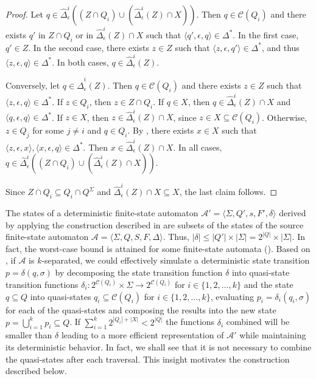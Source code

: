 \begin{proof}
  Let $q \in \hat{\Delta}_\epsilon^i((Z \cap Q_i) \cup (\hat{\Delta}_\epsilon^i(Z)
  \cap X))$. Then $q \in \mathcal{C}(Q_i)$ and there exists $q'$ in $Z \cap Q_i$ or in
  $\hat{\Delta}_\epsilon^i(Z) \cap X$ such that $\langle q', \epsilon, q \rangle \in
  \Delta^*$. In the first case, $q' \in Z$. In the second case, there exists $z \in Z$
  such that $\langle z, \epsilon, q' \rangle \in \Delta^*$, and thus $\langle z,
  \epsilon, q \rangle \in \Delta^*$. In both cases, $q \in \hat{\Delta}_\epsilon^i(Z)$.

  Conversely, let $q \in \hat{\Delta}_\epsilon^i(Z)$. Then $q \in \mathcal{C}(Q_i)$ and
  there exists $z \in Z$ such that $\langle z, \epsilon, q \rangle \in \Delta^*$. If $z
  \in Q_i$, then $z \in Z \cap Q_i$. If $q \in X$, then $q \in
  \hat{\Delta}_\epsilon^i(Z) \cap X$ and $\langle q, \epsilon, q \rangle \in \Delta^*$.
  If $z \in X$, then $z \in \hat{\Delta}_\epsilon^i(Z) \cap X$, since $z \in X
  \subseteq \mathcal{C}(Q_i)$. Otherwise, $z \in Q_j$ for some $j \neq i$ and $q \in
  Q_i$. By , there exists $x \in X$ such that $\langle z,
  \epsilon, x \rangle, \langle x, \epsilon, q \rangle \in \Delta^*$. Then $x \in
  \hat{\Delta}_\epsilon^i(Z) \cap X$. In all cases, $q \in \hat{\Delta}_\epsilon^i((Z
  \cap Q_i) \cup (\hat{\Delta}_\epsilon^i(Z) \cap X))$.

  Since $Z \cap Q_i \subseteq Q_i \cap Q^\Sigma$ and $\hat{\Delta}_\epsilon^i(Z) \cap X
  \subseteq X$, the last claim follows.
\end{proof}

The states of a deterministic finite-state automaton $\mathcal{A'} = \langle \Sigma,
Q', s, F', \delta \rangle$ derived by applying the construction described in
 are subsets of the states of the source finite-state automaton
$\mathcal{A} = \langle \Sigma, Q, S, F, \Delta \rangle$. Thus, $|\delta| \leq |Q'|
\times |\Sigma| = 2^{|Q|} \times |\Sigma|$. In fact, the worst-case bound is attained
for some finite-state automata (). Based on
, if $\mathcal{A}$ is $k$-separated, we could effectively
simulate a deterministic state transition $p = \delta(q, \sigma)$ by decomposing the
state transition function $\delta$ into quasi-state transition functions $\delta_i :
2^{\mathcal{C}(Q_i)} \times \Sigma \rightarrow 2^{\mathcal{C}(Q_i)}$ for $i \in \{
1, 2, \ldots, k \}$ and the state $q \subseteq Q$ into quasi-states $q_i \subseteq
\mathcal{C}(Q_i)$ for $i \in \{ 1, 2, \ldots, k \}$, evaluating $p_i = \delta_i(q_i,
\sigma)$ for each of the quasi-states and composing the results into the new state
$p = \bigcup_{i=1}^k p_i \subseteq Q$. If $\sum_{i=1}^k 2^{|Q_i| + |X|} < 2^{|Q|}$
the functions $\delta_i$ combined will be smaller than $\delta$ leading to a more
efficient representation of $\mathcal{A'}$ while maintaining its deterministic
behavior. In fact, we shall see that it is not necessary to combine the quasi-states
after each traversal. This insight motivates the construction described below.


